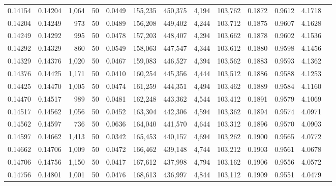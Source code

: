 \begin{tabular}{rrrrrrrrrrrrr}
0.14154 & 0.14204 & 1,064 &  50 &                                     0.0449 & 155,235 & 450,375 &   4,194 & 103,762 & 0.1872 & 0.9612 & 4.1718 \\
0.14204 & 0.14249 &   973 &  50 &                                     0.0489 & 156,208 & 449,402 &   4,244 & 103,712 & 0.1875 & 0.9607 & 4.1628 \\
0.14249 & 0.14292 &   995 &  50 &                                     0.0478 & 157,203 & 448,407 &   4,294 & 103,662 & 0.1878 & 0.9602 & 4.1536 \\
0.14292 & 0.14329 &   860 &  50 &                                     0.0549 & 158,063 & 447,547 &   4,344 & 103,612 & 0.1880 & 0.9598 & 4.1456 \\
0.14329 & 0.14376 & 1,020 &  50 &                                     0.0467 & 159,083 & 446,527 &   4,394 & 103,562 & 0.1883 & 0.9593 & 4.1362 \\
0.14376 & 0.14425 & 1,171 &  50 &                                     0.0410 & 160,254 & 445,356 &   4,444 & 103,512 & 0.1886 & 0.9588 & 4.1253 \\
0.14425 & 0.14470 & 1,005 &  50 &                                     0.0474 & 161,259 & 444,351 &   4,494 & 103,462 & 0.1889 & 0.9584 & 4.1160 \\
0.14470 & 0.14517 &   989 &  50 &                                     0.0481 & 162,248 & 443,362 &   4,544 & 103,412 & 0.1891 & 0.9579 & 4.1069 \\
0.14517 & 0.14562 & 1,056 &  50 &                                     0.0452 & 163,304 & 442,306 &   4,594 & 103,362 & 0.1894 & 0.9574 & 4.0971 \\
0.14562 & 0.14597 &   736 &  50 &                                     0.0636 & 164,040 & 441,570 &   4,644 & 103,312 & 0.1896 & 0.9570 & 4.0903 \\
0.14597 & 0.14662 & 1,413 &  50 &                                     0.0342 & 165,453 & 440,157 &   4,694 & 103,262 & 0.1900 & 0.9565 & 4.0772 \\
0.14662 & 0.14706 & 1,009 &  50 &                                     0.0472 & 166,462 & 439,148 &   4,744 & 103,212 & 0.1903 & 0.9561 & 4.0678 \\
0.14706 & 0.14756 & 1,150 &  50 &                                     0.0417 & 167,612 & 437,998 &   4,794 & 103,162 & 0.1906 & 0.9556 & 4.0572 \\
0.14756 & 0.14801 & 1,001 &  50 &                                     0.0476 & 168,613 & 436,997 &   4,844 & 103,112 & 0.1909 & 0.9551 & 4.0479 \\

\end{tabular}
